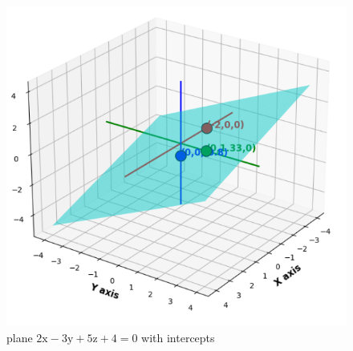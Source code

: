 \documentclass[journal,12pt,onecolumn]{IEEEtran}
\theoremstyle{remark}
\begin{document}
\begin{figure}[H]
\centering
\includegraphics[width=0.7\columnwidth]{figs/graph.png}
\caption*{plane $2\text{x} - 3\text{y} + 5\text{z} + 4 = 0$ with intercepts}
\label{fig:graph.png}
\end{figure}
\end{document}
